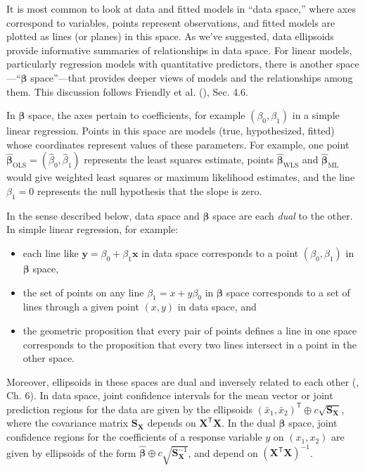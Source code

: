 \documentclass[
  letterpaper,
  10pt,
  krantz2]{krantz}
\providecommand{\tightlist}{%
  \setlength{\itemsep}{0pt}\setlength{\parskip}{0pt}}\usepackage{longtable,booktabs,array}
\begin{document}
It is most common to look at data and fitted models in ``data space,''
where axes correspond to variables, points represent observations, and
fitted models are plotted as lines (or planes) in this space. As we've
suggested, data ellipsoids provide informative summaries of
relationships in data space. For linear models, particularly regression
models with quantitative predictors, there is another
space---``\(\mathbf{\beta}\) space''---that provides deeper views of
models and the relationships among them. This discussion follows
Friendly et al. (), Sec.
4.6.

In \(\mathbf{\beta}\) space, the axes pertain to coefficients, for
example \((\beta_0, \beta_1)\) in a simple linear regression. Points in
this space are models (true, hypothesized, fitted) whose coordinates
represent values of these parameters. For example, one point
\(\widehat{\mathbf{\beta}}_{\text{OLS}} = (\hat{\beta}_0, \hat{\beta}_1)\)
represents the least squares estimate, points
\(\widehat{\mathbf{\beta}}_{\text{WLS}}\) and
\(\widehat{\mathbf{\beta}}_{\text{ML}}\) would give weighted least
squares or maximum likelihood estimates, and the line \(\beta_1 = 0\)
represents the null hypothesis that the slope is zero.

In the sense described below, data space and \(\boldsymbol{\beta}\)
space are each \emph{dual} to the other. In simple linear regression,
for example:

\begin{itemize}
\tightlist
\item
  each line like \(\mathbf{y} = \beta_0 + \beta_1 \mathbf{x}\) in data
  space corresponds to a point \((\beta_0,\beta_1)\) in
  \(\mathbf{\beta}\) space,
\item
  the set of points on any line \(\beta_1 = x + y \beta_0\) in
  \(\mathbf{\beta}\) space corresponds to a set of lines through a given
  point \((x, y)\) in data space, and
\item
  the geometric proposition that every pair of points defines a line in
  one space corresponds to the proposition that every two lines
  intersect in a point in the other space.
\end{itemize}

Moreover, ellipsoids in these spaces are dual and inversely related to
each other (, Ch. 6). In data
space, joint confidence intervals for the mean vector or joint
prediction regions for the data are given by the ellipsoids
\((\bar{x}_1, \bar{x}_2)^\mathsf{T} \oplus c \sqrt{\mathbf{S}_{\mathbf{X}}}\),
where the covariance matrix \(\mathbf{S}_{\mathbf{X}}\) depends on
\(\mathbf{X}^\mathsf{T}\mathbf{X}\). In the dual \(\mathbf{\beta}\)
space, joint confidence regions for the coefficients of a response
variable \(y\) on \((x_1, x_2)\) are given by ellipsoids of the form
\(\widehat{\mathbf{\beta}} \oplus c \sqrt{\mathbf{S}_{\mathbf{X}}^{-1}}\),
and depend on \(\mathbf{(\mathbf{X}^\mathsf{T}\mathbf{X})}^{-1}\).
\end{document}
